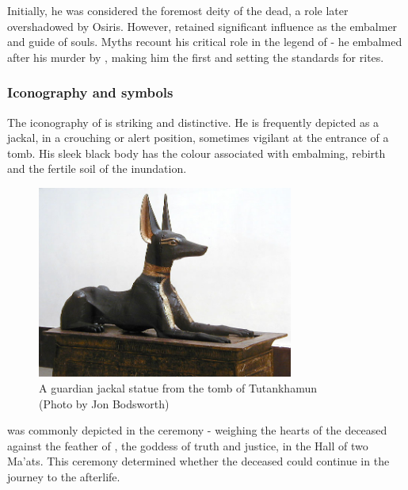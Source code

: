 Initially, he was considered the foremost deity of the dead, a role later overshadowed by Osiris. However,  retained significant influence as the embalmer and guide of souls. Myths recount his critical role in the legend of  - he embalmed  after his murder by , making him the first  and setting the standards for  rites.

\subsubsection*{Iconography and symbols}

The iconography of  is striking and distinctive. He is frequently depicted as a jackal, in a crouching or alert position, sometimes vigilant at the entrance of a tomb. His sleek black body has the colour associated with embalming, rebirth and the fertile soil of the  inundation.

\begin{figure} [H]
	\centering
	\includegraphics[width=0.75\textwidth]{../photos/Tutankhamun_Jackal}
	\caption{A guardian jackal statue from the tomb of Tutankhamun\\(Photo by Jon Bodsworth)}
\end{figure}

 was commonly depicted in the  ceremony - weighing the hearts of the deceased against the feather of , the goddess of truth and justice, in the Hall of two Ma'ats. This ceremony determined whether the deceased could continue in the journey to the afterlife.


